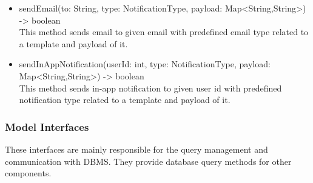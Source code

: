 \begin{itemize}
    \item sendEmail(to: String, type: NotificationType, payload: Map<String,String>) -> boolean \\ This method sends email to given email with predefined email type related to a template and payload of it.
    \item sendInAppNotification(userId: int, type: NotificationType, payload: Map<String,String>) -> boolean \\ This method sends in-app notification to given user id with predefined notification type related to a template and payload of it.
\end{itemize}
\subsubsection{Model Interfaces}
These interfaces are mainly responsible for the query management and communication with DBMS. They provide database query methods for other components. 
